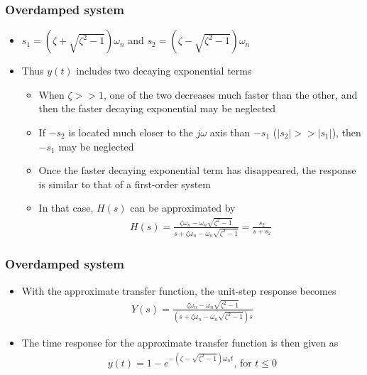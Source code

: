 \begin{frame}
\frametitle{Overdamped system}
\begin{itemize}
\item $s_1 = (\zeta +\sqrt{\zeta^2 -1})\omega_n$ and $s_2 = (\zeta -\sqrt{\zeta^2 -1})\omega_n$
\vspace{0.3cm}
\item Thus $y(t)$ includes two decaying exponential terms
\begin{itemize}
\vspace{0.2cm}
\item When $\zeta >> 1$, one of the two decreases much faster than the other, and then the faster decaying exponential may be neglected
\vspace{0.2cm}
\item If $-s_2$ is located much closer to the $j\omega$ axis than $-s_1$ ($|s_2|>>|s_1|$), then $-s_1$ may be neglected
\vspace{0.3cm}
\item Once the faster decaying exponential term has disappeared, the response is similar to that of a first-order system
\vspace{0.3cm}
\item In that case, $H(s)$ can be approximated by
\\ 
\begin{align*}
H(s) = \frac{\zeta\omega_n - \omega_n\sqrt{\zeta^2-1}}{s+\zeta\omega_n -\omega_n\sqrt{\zeta^2-1}}=\frac{s_2}{s+s_2}
\end{align*}
\end{itemize}
\end{itemize}
\end{frame}

\begin{frame}
\frametitle{Overdamped system}
\begin{itemize}
\item With the approximate transfer function, the unit-step response becomes
\\
\begin{align*}
 Y(s) = \frac{\zeta\omega_n - \omega_n\sqrt{\zeta^2-1}}{(s+\zeta\omega_n -\omega_n\sqrt{\zeta^2-1})s}
\end{align*}
\item The time response for the approximate transfer function is then given as
\\ 
\begin{align*}
y(t)= 1 -e^{-(\zeta-\sqrt{\zeta^2 -1})\omega_n t}\text{, for }t\le 0
\end{align*}
\end{itemize}
\end{frame}


